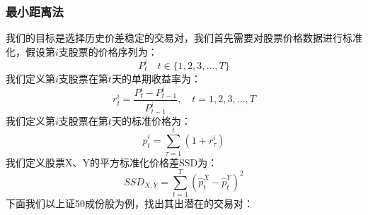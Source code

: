 \subsubsection{最小距离法}
我们的目标是选择历史价差稳定的交易对，我们首先需要对股票价格数据进行标准化，假设第$i$支股票的价格序列为：
\begin{equation}
P^{i}_{t} \quad t \in \{1, 2, 3, ..., T \}
\label{e0402-stock-price-series}
\end{equation}
我们定义第$i$支股票在第$t$天的单期收益率为：
\begin{equation}
r^{i}_{t} = \frac{P^{i}_{t} - P^{i}_{t-1}}{ P^{i}_{t-1} }, \quad t=1, 2, 3, ..., T
\label{e0402-stock-invest-return-t-th-day}
\end{equation}
我们定义第$i$支股票在第$t$天的标准价格为：
\begin{equation}
\hat{p}^{i}_{t} = \sum _{\tau = 1}^{t} (1 + r_{\tau}^{i})
\label{e0402-stock-standard-price-t-th-day}
\end{equation}
我们定义股票X、Y的平方标准化价格差SSD为：
\begin{equation}
SSD_{X,Y} = \sum _{t=1}^{T} (\hat{p}_{t}^{X} - \hat{p}_{t}^{Y})^{2}
\label{e0402-stock-square-standard-price-diff}
\end{equation}
下面我们以上证50成份股为例，找出其出潜在的交易对：
